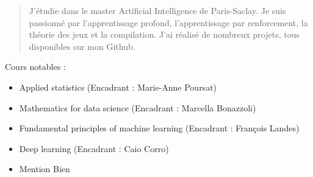 \documentclass[10pt,a4paper,ragged2e,withhyper]{altacv}
\begin{document}
\begin{paracol}{2}
        
        
        \newpage
        
        \switchcolumn
        
            \begin{quote}
                J'étudie dans le master Artificial Intelligence de Paris-Saclay.
                Je suis passionné par l'apprentissage profond, l'apprentissage par renforcement,
                la théorie des jeux et la compilation.
                J'ai réalisé de nombreux projets, tous disponibles sur mon Github.
            \end{quote}
        
        
            Cours notables :
            \vspace{2pt}
            \begin{itemize}
                \item Applied statistics (Encadrant : Marie-Anne Poursat)
                \item Mathematics for data science (Encadrant : Marcella Bonazzoli)
                \item Fundamental principles of machine learning (Encadrant : François Landes)
                \item Deep learning (Encadrant : Caio Corro)
            \end{itemize}
            \divider

            \begin{itemize}
                \item Mention Bien
            \end{itemize}
            

\end{paracol}
\end{document}
